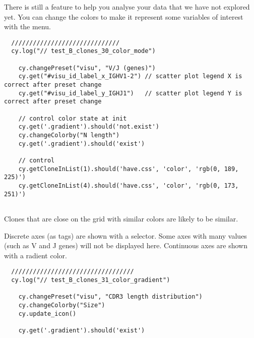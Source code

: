 There is still a feature to help you analyse your data that we have not
explored yet.
You can change the colors to make it represent some variables of interest
with the  menu.
\begin{verbatim}
  //////////////////////////////
  cy.log("// test_B_clones_30_color_mode")

    cy.changePreset("visu", "V/J (genes)")
    cy.get("#visu_id_label_x_IGHV1-2") // scatter plot legend X is correct after preset change
    cy.get("#visu_id_label_y_IGHJ1")   // scatter plot legend Y is correct after preset change

    // control color state at init
    cy.get('.gradient').should('not.exist')
    cy.changeColorby("N length")
    cy.get('.gradient').should('exist')

    // control
    cy.getCloneInList(1).should('have.css', 'color', 'rgb(0, 189, 225)')
    cy.getCloneInList(4).should('have.css', 'color', 'rgb(0, 173, 251)')


\end{verbatim}
  
Clones that are close on the grid with similar colors are likely to
be similar.

Discrete axes (as tags) are shown with a selector.
Some axes with many values (such as V and J genes) will not be displayed here.
Continuous axes are shown with a radient color.
\begin{verbatim}
  //////////////////////////////////
  cy.log("// test_B_clones_31_color_gradient")

    cy.changePreset("visu", "CDR3 length distribution")
    cy.changeColorby("Size")
    cy.update_icon()

    cy.get('.gradient').should('exist')


\end{verbatim}

